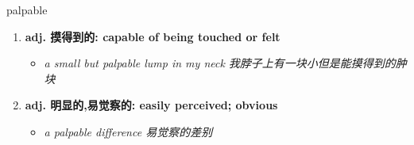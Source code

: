 
\begin{frame}
{\huge palpable}
\begin{center}
\begin{enumerate}\Large
  \item \textbf{adj. 摸得到的: capable of being touched or felt}
  \begin{itemize}
    \item \em{\Large{a small but palpable lump in my neck 我脖子上有一块小但是能摸得到的肿块}}
  \end{itemize}
  \item \textbf{adj. 明显的,易觉察的: easily perceived; obvious}
  \begin{itemize}
    \item \em{\Large{a palpable difference 易觉察的差别}}
  \end{itemize}
\end{enumerate}
\end{center}
\end{frame}
